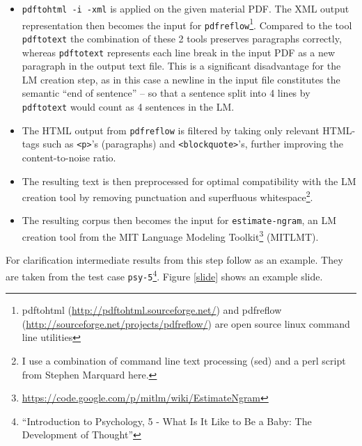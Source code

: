 \documentclass[]{article}
\providecommand{\tightlist}{%
  \setlength{\itemsep}{0pt}\setlength{\parskip}{0pt}}
\begin{document}
\begin{enumerate}
  \begin{itemize}
  \tightlist
  \item
    \texttt{pdftohtml\ -i\ -xml} is applied on the given material PDF.
    The XML output representation then becomes the input for
    \texttt{pdfreflow}\footnote{pdftohtml
      (\url{http://pdftohtml.sourceforge.net/}) and pdfreflow
      (\url{http://sourceforge.net/projects/pdfreflow/}) are open source
      linux command line utilities}. Compared to the tool
    \texttt{pdftotext} the combination of these 2 tools preserves
    paragraphs correctly, whereas \texttt{pdftotext} represents each
    line break in the input PDF as a new paragraph in the output text
    file. This is a significant disadvantage for the LM creation step,
    as in this case a newline in the input file constitutes the semantic
    ``end of sentence'' -- so that a sentence split into 4 lines by
    \texttt{pdftotext} would count as 4 sentences in the LM.
  \item
    The HTML output from \texttt{pdfreflow} is filtered by taking only
    relevant HTML-tags such as \texttt{\textless{}p\textgreater{}}'s
    (paragraphs) and \texttt{\textless{}blockquote\textgreater{}}'s,
    further improving the content-to-noise ratio.
  \item
    The resulting text is then preprocessed for optimal compatibility
    with the LM creation tool by removing punctuation and superfluous
    whitespace\footnote{I use a combination of command line text
      processing (sed) and a perl script from Stephen Marquard here.}.
  \item
    The resulting corpus then becomes the input for
    \texttt{estimate-ngram}, an LM creation tool from the MIT Language
    Modeling Toolkit\footnote{\url{https://code.google.com/p/mitlm/wiki/EstimateNgram}}
    (MITLMT).
  \end{itemize}

  For clarification intermediate results from this step follow as an
  example. They are taken from the test case \texttt{psy-5}\footnote{``Introduction
    to Psychology, 5 - What Is It Like to Be a Baby: The Development of
    Thought''}. Figure \ref{slide} shows an example slide.


\end{enumerate}
\end{document}
